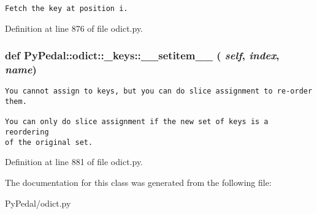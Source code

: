 \footnotesize\begin{verbatim}Fetch the key at position i.\end{verbatim}
\normalsize
 

Definition at line 876 of file odict.py.\hypertarget{classPyPedal_1_1odict_1_1__keys_98a66ca0916d9cd98933b5b4fdb3018f}{
\subsubsection{\setlength{\rightskip}{0pt plus 5cm}def PyPedal::odict::\_\-keys::\_\-\_\-setitem\_\-\_\- ( {\em self}, \/   {\em index}, \/   {\em name})}}
\label{classPyPedal_1_1odict_1_1__keys_98a66ca0916d9cd98933b5b4fdb3018f}




\footnotesize\begin{verbatim}
You cannot assign to keys, but you can do slice assignment to re-order
them.

You can only do slice assignment if the new set of keys is a reordering
of the original set.
\end{verbatim}
\normalsize
 

Definition at line 881 of file odict.py.

The documentation for this class was generated from the following file:\begin{CompactItemize}
\item 
PyPedal/odict.py\end{CompactItemize}
